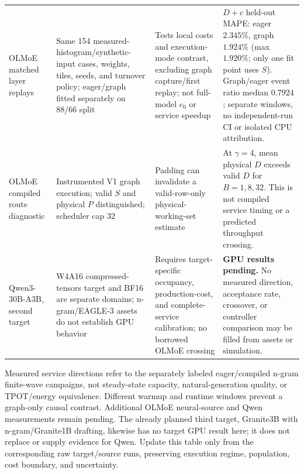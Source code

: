 \begin{table}[t]
\begin{tabularx}{\textwidth}{@{}p{}p{}p{}X@{}}
OLMoE matched layer replays & Same 154 measured-histogram/synthetic-input cases, weights, tiles, seeds, and turnover policy; eager/graph fitted separately on 88/66 split & Tests local costs and execution-mode contrast, excluding graph capture/first replay; not full-model $c_0$ or service speedup & $D+c$ held-out MAPE: eager $2.345\%$, graph $1.924\%$ (max $1.920\%$; only one fit point uses $S$). Graph/eager event ratio median $0.7924$; separate windows, no independent-run CI or isolated CPU attribution. \\
OLMoE compiled route diagnostic & Instrumented V1 graph execution; valid $S$ and physical $P$ distinguished; scheduler cap 32 & Padding can invalidate a valid-row-only physical-working-set estimate & At $\gamma=4$, mean physical $D$ exceeds valid $D$ for $B=1,8,32$. This is not compiled service timing or a predicted throughput crossing. \\
Qwen3-30B-A3B, second target & W4A16 compressed-tensors target and BF16 are separate domains; n-gram/EAGLE-3 assets do not establish GPU behavior & Requires target-specific occupancy, production-cost, and complete-service calibration; no borrowed OLMoE crossing & \textbf{GPU results pending.} No measured direction, acceptance rate, crossover, or controller comparison may be filled from assets or simulation. \\
\bottomrule
\end{tabularx}
\par\smallskip
\begin{minipage}{\textwidth}\footnotesize
Measured service directions refer to the separately labeled eager/compiled n-gram finite-wave campaigns, not steady-state capacity, natural-generation quality, or TPOT/energy equivalence. Different warmup and runtime windows prevent a graph-only causal contrast. Additional OLMoE neural-source and Qwen measurements remain pending. The already planned third target, Granite3B with n-gram/Granite1B drafting, likewise has no target GPU result here; it does not replace or supply evidence for Qwen. Update this table only from the corresponding raw target/source runs, preserving execution regime, population, cost boundary, and uncertainty.
\end{minipage}
\end{table}
